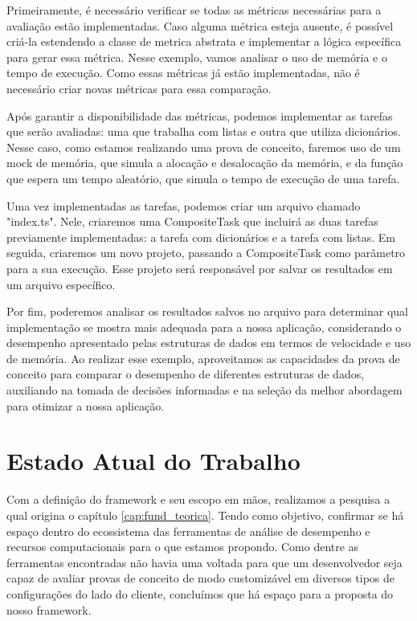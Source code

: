 \documentclass[12pt]{tcc}
\begin{document}
Primeiramente, é necessário verificar se todas as métricas necessárias para a avaliação estão implementadas. Caso alguma métrica esteja ausente, é possível criá-la estendendo a classe de metrica abstrata e implementar a lógica específica para gerar essa métrica. Nesse exemplo, vamos analisar o uso de memória e o tempo de execução. Como essas métricas já estão implementadas, não é necessário criar novas métricas para essa comparação.

Após garantir a disponibilidade das métricas, podemos implementar as tarefas que serão avaliadas: uma que trabalha com listas e outra que utiliza dicionários. Nesse caso, como estamos realizando uma prova de conceito, faremos uso de um mock de memória, que simula a alocação e desalocação da memória, e da função que espera um tempo aleatório, que simula o tempo de execução de uma tarefa.

Uma vez implementadas as tarefas, podemos criar um arquivo chamado "index.ts". Nele, criaremos uma CompositeTask que incluirá as duas tarefas previamente implementadas: a tarefa com dicionários e a tarefa com listas. Em seguida, criaremos um novo projeto, passando a CompositeTask como parâmetro para a sua execução. Esse projeto será responsável por salvar os resultados em um arquivo específico.

Por fim, poderemos analisar os resultados salvos no arquivo para determinar qual implementação se mostra mais adequada para a nossa aplicação, considerando o desempenho apresentado pelas estruturas de dados em termos de velocidade e uso de memória. Ao realizar esse exemplo, aproveitamos as capacidades da prova de conceito para comparar o desempenho de diferentes estruturas de dados, auxiliando na tomada de decisões informadas e na seleção da melhor abordagem para otimizar a nossa aplicação.

\chapter{Estado Atual do Trabalho}
\label{cap:estado_atual}

Com a definição do framework e seu escopo em mãos, realizamos a pesquisa a qual origina o capítulo \ref{cap:fund_teorica}.
Tendo como objetivo, confirmar se há espaço dentro do ecossistema das ferramentas de análise de desempenho e recursos computacionais para o que estamos propondo.
Como dentre as ferramentas encontradas não havia uma voltada para que um desenvolvedor seja capaz de avaliar provas de conceito de modo customizável em diversos tipos de configurações do lado do cliente, concluímos que há espaço para a proposta do nosso framework.
\end{document}
